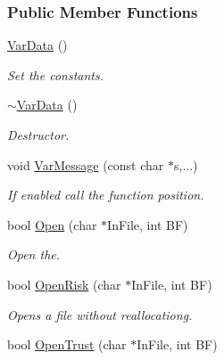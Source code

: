 \subsubsection*{\-Public \-Member \-Functions}
\begin{DoxyCompactItemize}
\item 
\hypertarget{classVarData_a159e408a7c67c4b4ff12edd72d315bd4}{\hyperlink{classVarData_a159e408a7c67c4b4ff12edd72d315bd4}{\-Var\-Data} ()}\label{classVarData_a159e408a7c67c4b4ff12edd72d315bd4}

\begin{DoxyCompactList}\small\item\em \-Set the constants. \end{DoxyCompactList}\item 
\hypertarget{classVarData_a66a331d8378209908c6b154d79723977}{\hyperlink{classVarData_a66a331d8378209908c6b154d79723977}{$\sim$\-Var\-Data} ()}\label{classVarData_a66a331d8378209908c6b154d79723977}

\begin{DoxyCompactList}\small\item\em \-Destructor. \end{DoxyCompactList}\item 
\hypertarget{classVarData_a616b8e0974fde7798bb09b9af1b339ae}{void \hyperlink{classVarData_a616b8e0974fde7798bb09b9af1b339ae}{\-Var\-Message} (const char $\ast$s,...)}\label{classVarData_a616b8e0974fde7798bb09b9af1b339ae}

\begin{DoxyCompactList}\small\item\em \-If enabled call the function position. \end{DoxyCompactList}\item 
bool \hyperlink{classVarData_a50a785f6295f7e7fb2494fcad2a2a7fc}{\-Open} (char $\ast$\-In\-File, int \-B\-F)
\begin{DoxyCompactList}\small\item\em \-Open the. \end{DoxyCompactList}\item 
\hypertarget{classVarData_a385ea4b67d94de234204940ef8da368d}{bool \hyperlink{classVarData_a385ea4b67d94de234204940ef8da368d}{\-Open\-Risk} (char $\ast$\-In\-File, int \-B\-F)}\label{classVarData_a385ea4b67d94de234204940ef8da368d}

\begin{DoxyCompactList}\small\item\em \-Opens a file without reallocationg. \end{DoxyCompactList}\item 
\hypertarget{classVarData_a2d7ca8dfc2fc40c902e22b3110f359ca}{bool \hyperlink{classVarData_a2d7ca8dfc2fc40c902e22b3110f359ca}{\-Open\-Trust} (char $\ast$\-In\-File, int \-B\-F)}\label{classVarData_a2d7ca8dfc2fc40c902e22b3110f359ca}


\end{DoxyCompactItemize}
